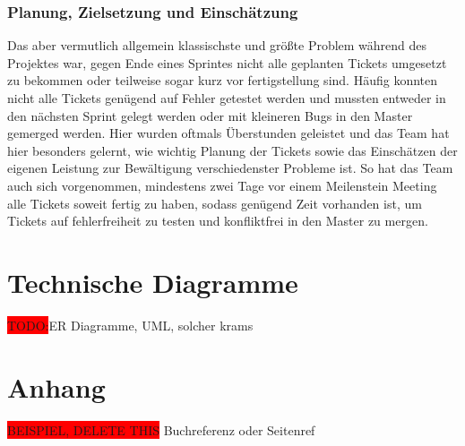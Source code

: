 \documentclass[10pt, a4paper, draft]{article}
\begin{document}
\subsubsection{Planung, Zielsetzung und Einschätzung}
Das aber vermutlich allgemein klassischste und größte Problem während des Projektes war, gegen Ende eines Sprintes nicht alle geplanten Tickets umgesetzt zu bekommen oder teilweise sogar kurz vor fertigstellung sind.
Häufig konnten nicht alle Tickets genügend auf Fehler getestet werden und mussten entweder in den nächsten Sprint gelegt werden oder mit kleineren Bugs in den Master gemerged werden.
Hier wurden oftmals Überstunden geleistet und das Team hat hier besonders gelernt, wie wichtig Planung der Tickets sowie das Einschätzen der eigenen Leistung zur Bewältigung verschiedenster Probleme ist.
So hat das Team auch sich vorgenommen, mindestens zwei Tage vor einem Meilenstein Meeting alle Tickets soweit fertig zu haben, sodass genügend Zeit vorhanden ist, um Tickets auf fehlerfreiheit zu testen und konfliktfrei in den Master zu mergen.

\section{Technische Diagramme}
\colorbox{red}{TODO:}ER Diagramme, UML, solcher krams

\newpage
\section{Anhang}
\colorbox{red}{BEISPIEL, DELETE THIS} Buchreferenz \cite{Literaturbeispiel:tom} oder Seitenref \cite{google}
\printbibliography
\end{document}
